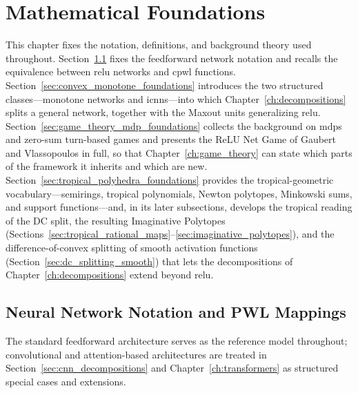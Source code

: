 \chapter{Mathematical Foundations}\label{ch:foundations}

This chapter fixes the notation, definitions, and background theory used throughout. Section~\ref{sec:nn_notation_pwl} fixes the feedforward network notation and recalls the equivalence between \ac{relu} networks and \ac{cpwl} functions. Section~\ref{sec:convex_monotone_foundations} introduces the two structured classes---monotone networks and \acp{icnn}---into which Chapter~\ref{ch:decompositions} splits a general network, together with the Maxout units generalizing \ac{relu}. Section~\ref{sec:game_theory_mdp_foundations} collects the background on \acp{mdp} and zero-sum turn-based games and presents the ReLU Net Game of Gaubert and Vlassopoulos in full, so that Chapter~\ref{ch:game_theory} can state which parts of the framework it inherits and which are new. Section~\ref{sec:tropical_polyhedra_foundations} provides the tropical-geometric vocabulary---semirings, tropical polynomials, Newton polytopes, Minkowski sums, and support functions---and, in its later subsections, develops the tropical reading of the DC split, the resulting Imaginative Polytopes (Sections~\ref{sec:tropical_rational_maps}--\ref{sec:imaginative_polytopes}), and the difference-of-convex splitting of smooth activation functions (Section~\ref{sec:dc_splitting_smooth}) that lets the decompositions of Chapter~\ref{ch:decompositions} extend beyond \ac{relu}.

\section{Neural Network Notation and PWL Mappings}\label{sec:nn_notation_pwl}

The standard feedforward architecture serves as the reference model throughout; convolutional and attention-based architectures are treated in Section~\ref{sec:cnn_decompositions} and Chapter~\ref{ch:transformers} as structured special cases and extensions.

